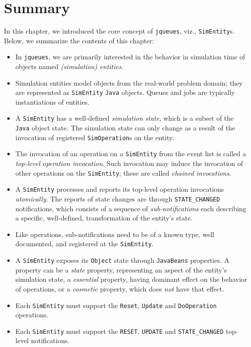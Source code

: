 \section{Summary}

In this chapter, we introduced the core concept of \lstinline|jqueues|,
  viz., \lstinline|SimEntity|s.
Below, we summarize the contents of this chapter:
\begin{itemize}
\item In \lstinline|jqueues|,
        we are primarily interested in the behavior in simulation time
        of objects named {\em (simulation) entities}.
\item Simulation entities model objects from the real-world
        problem domain; they are represented as \lstinline|SimEntity|
        \lstinline|Java| objects.
      Queues and jobs are typically instantiations of entities.
\item A \lstinline|SimEntity| has a well-defined
        {\em simulation state\/},
        which is a subset of the \lstinline|Java|
        object state.
      The simulation state can only change as a result
        of the invocation of registered \lstinline|SimOperation|s
        on the entity.
\item The invocation of an operation on a \lstinline|SimEntity|
        from the event list is called a {\em top-level operation invocation}.
      Such invocation may induce the invocation of other operations
        on the \lstinline|SimEntity|; these are called {\em chained invocations}.
\item A \lstinline|SimEntity| processes and reports its
        top-level operation invocations {\em atomically}.
      The reports of state changes are through \lstinline|STATE_CHANGED|
        notifications, which consists of a sequence of {\em sub-notifications\/}
        each describing a specific, well-defined, transformation of
        the entity's state.
\item Like operations, sub-notifications need to be of a known type,
        well documented,
        and registered at the \lstinline|SimEntity|.
\item A \lstinline|SimEntity| exposes its \lstinline|Object|
        state through \lstinline|JavaBeans| properties.
      A property can be a {\em state\/} property,
        representing an aspect of the entity's simulation state,
        a {\em essential\/} property,
        having dominant effect on the behavior of operations,
        or a {\em cosmetic\/} property,
        which does {\em not\/} have that effect.
\item Each \lstinline|SimEntity| must support the
        \lstinline|Reset|, \lstinline|Update|
        and \lstinline|DoOperation| operations.
\item Each \lstinline|SimEntity| must support the
        \lstinline|RESET|, \lstinline|UPDATE|
        and \lstinline|STATE_CHANGED| top-level notifications.
\end{itemize}